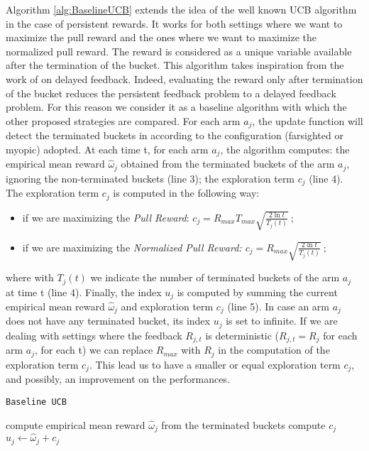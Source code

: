Algorithm \ref{alg:BaselineUCB} extends the idea of the well known UCB algorithm in the case of persistent rewards. It works for both settings where we want to maximize the pull reward and the ones where we want to maximize the normalized pull reward. The reward is considered as a unique variable available after the termination of the bucket. This algorithm takes inspiration from the work of \cite{joulani2013} on delayed feedback. Indeed, evaluating the reward only after termination of the bucket reduces the persistent feedback problem to a delayed feedback problem. For this reason we consider it as a baseline algorithm with which the other proposed strategies are compared. For each arm $a_j$, the update function will detect the terminated buckets in according to the configuration (farsighted or myopic) adopted. At each time t, for each arm $a_j$, the algorithm computes: the empirical mean reward $\hat{\omega}_j $ obtained from the terminated buckets of the arm $a_j$, ignoring the non-terminated buckets (line 3); the exploration term $c_j$ (line 4). The exploration term  $c_j$ is computed in the following way:
\begin{itemize}
	\item if we are maximizing the \emph{Pull Reward}: $c_j = R_{max}  T_{max}  \sqrt{\frac{2\ln t}{T_j(t)}} \ ;$
	\item if we are maximizing the \emph{Normalized Pull Reward: $c_j = R_{max}  \sqrt{\frac{2\ln t}{T_j(t)}} \ ;$}
\end{itemize}


 where with ${T_j(t)}$ we indicate the number of terminated buckets of the arm $a_j$ at time t (line 4). Finally, the index $u_j$ is computed by summing the current empirical mean reward $\hat{\omega}_j $ and exploration term $c_j$ (line 5). In case an arm $a_j$ does not have any terminated bucket, its index $u_j$ is set to infinite. If we are dealing with settings where the feedback $R_{j,t}$ is deterministic ($R_{j,t}=R_j$ for each arm $a_j$, for each t) we can replace $R_{max}$ with $R_j$ in the computation of the exploration term $c_j$. This lead us to have a smaller or equal exploration term $c_j$, and possibly, an improvement on the performances.%

\begin{algorithm}[H]
	\caption{\texttt{Baseline UCB}}
	\begin{scriptsize}
		\begin{algorithmic}[1]
			
			\State compute empirical mean reward $\hat{\omega}_j $ from the terminated buckets \;			
			\State compute $c_j$\;
			\State$u_j \gets  \hat{\omega}_j +  c_j$
			\EndFor
			
			\EndFunction
			
		\end{algorithmic}
	\end{scriptsize}
	\label{alg:BaselineUCB}
\end{algorithm}

